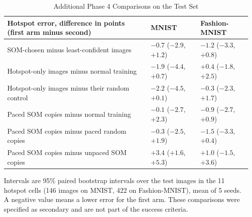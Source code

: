 \documentclass{scrartcl}
\begin{document}
\begin{table}[H]
\centering
\caption{Additional Phase 4 Comparisons on the Test Set}
\label{tab:p4extra}
\renewcommand{\arraystretch}{1.12}
\footnotesize
\begin{tabular}{|L{0.46\textwidth}|C{0.22\textwidth}|C{0.22\textwidth}|}
\hline
\textbf{Hotspot error, difference in points (first arm minus second)} & \textbf{MNIST} & \textbf{Fashion-MNIST} \\ \hline
SOM-chosen minus least-confident images & $-0.7$ ($-2.9$, $+1.2$) & $-1.2$ ($-3.3$, $+0.8$) \\ \hline
Hotspot-only images minus normal training & $-1.9$ ($-4.4$, $+0.7$) & $+0.4$ ($-1.8$, $+2.5$) \\ \hline
Hotspot-only images minus their random control & $-2.2$ ($-4.5$, $+0.1$) & $-0.3$ ($-2.3$, $+1.7$) \\ \hline
Paced SOM copies minus normal training & $-0.1$ ($-2.7$, $+2.3$) & $-0.9$ ($-2.7$, $+0.9$) \\ \hline
Paced SOM copies minus paced random copies & $-0.3$ ($-2.5$, $+1.9$) & $-1.5$ ($-3.3$, $+0.4$) \\ \hline
Paced SOM copies minus unpaced SOM copies & $+3.4$ ($+1.6$, $+5.3$) & $+1.0$ ($-1.5$, $+3.6$) \\ \hline
\end{tabular}

\par\vspace{3pt}
{\footnotesize\raggedright\noindent Intervals are 95\% paired bootstrap intervals over the test images in the 11 hotspot cells (146 images on MNIST, 422 on Fashion-MNIST), mean of 5 seeds. A negative value means a lower error for the first arm. These comparisons were specified as secondary and are not part of the success criteria.\par}
\end{table}
\end{document}

